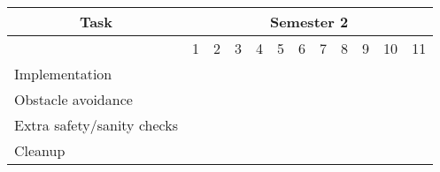 \documentclass{article}
\begin{document}
\begin{table}[H]
\begin{tabular}{@{}llllllllllll@{}}
\toprule
\multicolumn{1}{c}{Task} & \multicolumn{11}{c}{Semester 2} \\ \midrule
 & 1 & 2 & 3 & 4 & 5 & 6 & 7 & 8 & 9 & 10 & 11 \\ \midrule
Implementation & \multicolumn{11}{l}{} \\ \midrule
\indent Obstacle avoidance & \cellcolor[HTML]{34FF34} & \cellcolor[HTML]{34FF34} & \cellcolor[HTML]{34FF34} & \cellcolor[HTML]{34FF34} &  &  &  &  &  &  &  \\ \midrule
\indent Extra safety/sanity checks &  &  &  &  & \cellcolor[HTML]{34FF34}{\color[HTML]{000000} } & \cellcolor[HTML]{34FF34}{\color[HTML]{000000} } &  &  &  &  &  \\ \midrule
Cleanup &  &  &  &  &  & \cellcolor[HTML]{34FF34} & \cellcolor[HTML]{34FF34} & \cellcolor[HTML]{34FF34} & \cellcolor[HTML]{34FF34} & \cellcolor[HTML]{34FF34} & \cellcolor[HTML]{34FF34} \\ \bottomrule
\end{tabular}
\end{table}

\printbibliography[]
\end{document}
